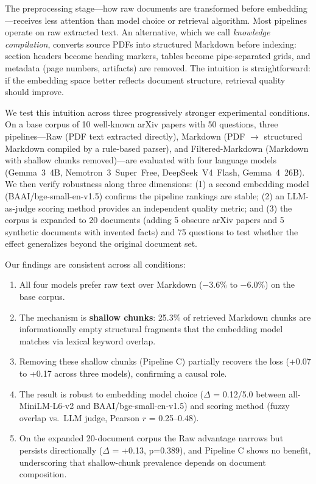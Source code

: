 \documentclass{article}
\begin{document}
The preprocessing stage---how raw documents are transformed before embedding---receives less attention than model choice or retrieval algorithm. Most pipelines operate on raw extracted text. An alternative, which we call \emph{knowledge compilation}, converts source PDFs into structured Markdown before indexing: section headers become heading markers, tables become pipe-separated grids, and metadata (page numbers, artifacts) are removed. The intuition is straightforward: if the embedding space better reflects document structure, retrieval quality should improve.

We test this intuition across three progressively stronger experimental conditions. On a base corpus of 10 well-known arXiv papers with 50 questions, three pipelines---Raw (PDF text extracted directly), Markdown (PDF $\rightarrow$ structured Markdown compiled by a rule-based parser), and Filtered-Markdown (Markdown with shallow chunks removed)---are evaluated with four language models (Gemma~3~4B, Nemotron~3~Super~Free, DeepSeek~V4~Flash, Gemma~4~26B). We then verify robustness along three dimensions: (1) a second embedding model (BAAI/bge-small-en-v1.5) confirms the pipeline rankings are stable; (2) an LLM-as-judge scoring method provides an independent quality metric; and (3) the corpus is expanded to 20 documents (adding 5 obscure arXiv papers and 5 synthetic documents with invented facts) and 75 questions to test whether the effect generalizes beyond the original document set.

Our findings are consistent across all conditions:

\begin{enumerate}
    \item All four models prefer raw text over Markdown ($-$3.6\% to $-$6.0\%) on the base corpus.
    \item The mechanism is \textbf{shallow chunks}: 25.3\% of retrieved Markdown chunks are informationally empty structural fragments that the embedding model matches via lexical keyword overlap.
    \item Removing these shallow chunks (Pipeline C) partially recovers the loss (+0.07 to +0.17 across three models), confirming a causal role.
    \item The result is robust to embedding model choice ($\Delta$ = 0.12/5.0 between all-MiniLM-L6-v2 and BAAI/bge-small-en-v1.5) and scoring method (fuzzy overlap vs.\ LLM judge, Pearson $r$ = 0.25--0.48).
    \item On the expanded 20-document corpus the Raw advantage narrows but persists directionally ($\Delta$ = +0.13, p=0.389), and Pipeline C shows no benefit, underscoring that shallow-chunk prevalence depends on document composition.
\end{enumerate}
\end{document}
